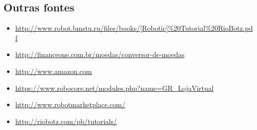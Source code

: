 \documentclass{article}
\begin{document}
\begin{appendix}
    \section{Outras fontes}
    \begin{itemize}
        \item \url{http://www.robot.bmstu.ru/files/books/[Robotic]%20Tutorial%20RioBotz.pdf}
        \item \url{http://financeone.com.br/moedas/conversor-de-moedas}
        \item \url{http://www.amazon.com}
        \item \url{https://www.robocore.net/modules.php?name=GR_LojaVirtual}
        \item \url{http://www.robotmarketplace.com/}
        \item \url{http://riobotz.com/pb/tutorials/}
    \end{itemize}

\end{appendix}
\end{document}
